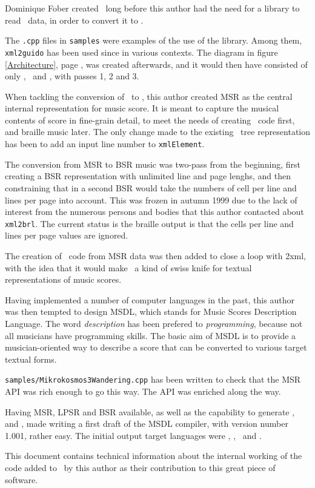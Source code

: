 Dominique Fober created \lib\ long before this author had the need for a library to read \mxml\ data, in order to convert it to \lily.

The {\tt *.cpp} files in {\tt samples} were examples of the use of the library. Among them, {\tt xml2guido} has been used since in various contexts.
The diagram in figure \ref {Architecture}, page \pageref {Architecture}, was created afterwards, and it would then have consisted of only \mxml, \mxmlt\ and \guido, with passes 1, 2 and 3.

When tackling the conversion of \mxml\ to \lily, this author created MSR as the central internal representation for music score. It is meant to capture the musical contents of score in fine-grain detail, to meet the needs of creating \lily\ code first, and braille music later.
The only change made to the existing \mxml\ tree representation has been to add an input line number to {\tt xmlElement}.

The conversion from MSR to BSR music was two-pass from the beginning, first creating a BSR representation with unlimited line and page lenghs, and then constraining that in a second BSR would take the numbers of cell per line and lines per page into account.
This was frozen in autumn 1999 due to the lack of interest from the numerous persons and bodies that this author contacted about {\tt xml2brl}.
The current status is the braille output is that the cells per line and lines per page values are ignored.

The creation of \mxml\ code from MSR data was then added to close a loop with \mxml2xml, with the idea that it would make \lib\ a kind of swiss knife for textual representations of music scores.

Having implemented a number of computer languages in the past, this author was then tempted to design MSDL, which stands for Music Scores Description Language. The word {\it description} has been prefered to {\it programming}, because not all musicians have programming skills.
The basic aim of MSDL is to provide a musician-oriented way to describe a score that can be converted to various target textual forms.

{\tt samples/Mikrokosmos3Wandering.cpp} has been written to check that the MSR API was rich enough to go this way. The API was enriched along the way.

Having MSR, LPSR and BSR available, as well as the capability to generate \mxml, \lily\, \guido and \braille, made writing a first draft of the MSDL compiler, with version number 1.001, rather easy. The initial output target languages were \mxml, \lily, \mxml\ and \braille.

This document contains technical information about the internal working of the code added to \lib\ by this author as their contribution to this great piece of software.

